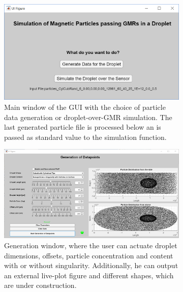 \begin{landscape}
	\centering
	\begin{figure}
		\begin{subfigure}{0.49\linewidth} 
			\centering
			\includegraphics[clip,trim={0.5mm 1mm 1mm 2mm}, scale=.7 ]{Ressourcen/IMG/GUI_main}
			\caption{Main window of the GUI with the choice of particle data generation or droplet-over-GMR simulation. The last generated particle file is processed below an is passed as standard value to the simulation function.}
			\label{fig:sim:GUI:main}
		\end{subfigure}
		\hfil
		\begin{subfigure}{0.49\linewidth} 
			\centering
			\includegraphics[clip,trim={1mm 1mm 1mm 2mm},scale=.4]{Ressourcen/IMG/GUI_generation}
			\caption{Generation window, where the user can actuate droplet dimensions, offsets, particle concentration and content with or without singularity. Additionally, he can output an external live-plot figure and different shapes, which are under construction.}
			\label{fig:sim:GUI:generation}
		\end{subfigure}
		\vfil
		\begin{subfigure}{0.49\linewidth} 

\end{subfigure}
\end{figure}
\end{landscape}
